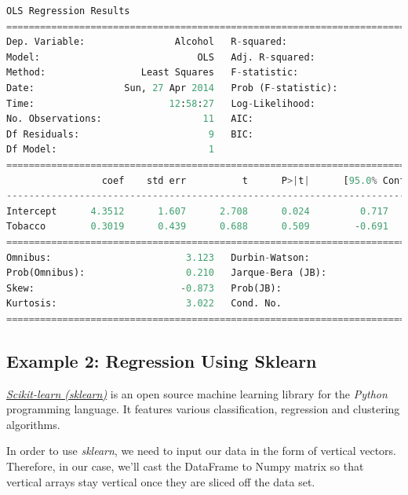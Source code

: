 \small
\begin{lstlisting}[language=Python]
                            OLS Regression Results
==============================================================================
Dep. Variable:                Alcohol   R-squared:                       0.050
Model:                            OLS   Adj. R-squared:                 -0.056
Method:                 Least Squares   F-statistic:                    0.4735
Date:                Sun, 27 Apr 2014   Prob (F-statistic):              0.509
Time:                        12:58:27   Log-Likelihood:                -12.317
No. Observations:                  11   AIC:                             28.63
Df Residuals:                       9   BIC:                             29.43
Df Model:                           1
==============================================================================
                 coef    std err          t      P>|t|      [95.0% Conf. Int.]
------------------------------------------------------------------------------
Intercept      4.3512      1.607      2.708      0.024         0.717     7.986
Tobacco        0.3019      0.439      0.688      0.509        -0.691     1.295
==============================================================================
Omnibus:                        3.123   Durbin-Watson:                   1.655
Prob(Omnibus):                  0.210   Jarque-Bera (JB):                1.397
Skew:                          -0.873   Prob(JB):                        0.497
Kurtosis:                       3.022   Cond. No.                         25.5
==============================================================================
\end{lstlisting}
\normalsize


\subsection{Example 2: Regression Using Sklearn}

\href{http://scikit-learn.org/}{\emph{Scikit-learn (sklearn)}}  is an open source machine learning library for the \emph{Python} programming language. It features various classification, regression and clustering algorithms.

In order to use \emph{sklearn}, we need to input our data in the form of vertical vectors. Therefore, in our case, we’ll cast the DataFrame to Numpy matrix so that vertical arrays stay vertical once they are sliced off the data set.


